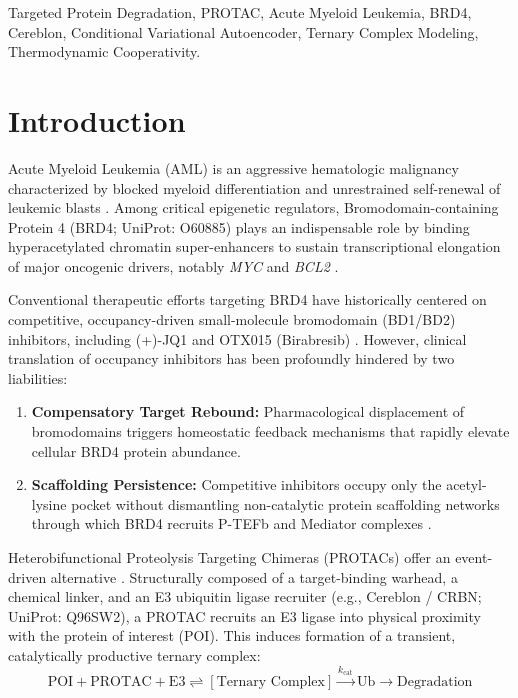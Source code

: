 \documentclass[conference]{IEEEtran}
\begin{document}
\begin{IEEEkeywords}
Targeted Protein Degradation, PROTAC, Acute Myeloid Leukemia, BRD4, Cereblon, Conditional Variational Autoencoder, Ternary Complex Modeling, Thermodynamic Cooperativity.
\end{IEEEkeywords}

\section{Introduction}
Acute Myeloid Leukemia (AML) is an aggressive hematologic malignancy characterized by blocked myeloid differentiation and unrestrained self-renewal of leukemic blasts \cite{dohner2015}. Among critical epigenetic regulators, Bromodomain-containing Protein 4 (BRD4; UniProt: O60885) plays an indispensable role by binding hyperacetylated chromatin super-enhancers to sustain transcriptional elongation of major oncogenic drivers, notably \textit{MYC} and \textit{BCL2} \cite{zuber2011}.

Conventional therapeutic efforts targeting BRD4 have historically centered on competitive, occupancy-driven small-molecule bromodomain (BD1/BD2) inhibitors, including (+)-JQ1 and OTX015 (Birabresib) \cite{filippakopoulos2010}. However, clinical translation of occupancy inhibitors has been profoundly hindered by two liabilities:
\begin{enumerate}
    \item \textbf{Compensatory Target Rebound:} Pharmacological displacement of bromodomains triggers homeostatic feedback mechanisms that rapidly elevate cellular BRD4 protein abundance.
    \item \textbf{Scaffolding Persistence:} Competitive inhibitors occupy only the acetyl-lysine pocket without dismantling non-catalytic protein scaffolding networks through which BRD4 recruits P-TEFb and Mediator complexes \cite{winter2015}.
\end{enumerate}

Heterobifunctional Proteolysis Targeting Chimeras (PROTACs) offer an event-driven alternative \cite{sakamoto2001}. Structurally composed of a target-binding warhead, a chemical linker, and an E3 ubiquitin ligase recruiter (e.g., Cereblon / CRBN; UniProt: Q96SW2), a PROTAC recruits an E3 ligase into physical proximity with the protein of interest (POI). This induces formation of a transient, catalytically productive ternary complex:
\begin{equation}
\text{POI} + \text{PROTAC} + \text{E3} \rightleftharpoons [\text{Ternary Complex}] \xrightarrow{k_{\text{cat}}} \text{Ub} \rightarrow \text{Degradation}
\end{equation}
\end{document}
